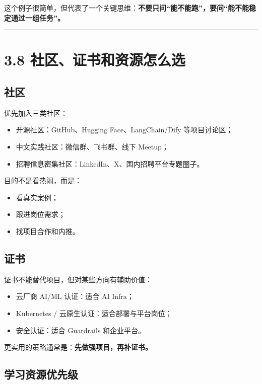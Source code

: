这个例子很简单，但代表了一个关键思维：\textbf{不要只问“能不能跑”，要问“能不能稳定通过一组任务”。}


\bigskip\hrule\bigskip

\section{3.8 社区、证书和资源怎么选}

\subsection{社区}

优先加入三类社区：


\begin{itemize}[leftmargin=2em]
\item 开源社区：GitHub、Hugging Face、LangChain/Dify 等项目讨论区；
\item 中文实践社区：微信群、飞书群、线下 Meetup；
\item 招聘信息密集社区：LinkedIn、X、国内招聘平台专题圈子。
\end{itemize}

目的不是看热闹，而是：


\begin{itemize}[leftmargin=2em]
\item 看真实案例；
\item 跟进岗位需求；
\item 找项目合作和内推。
\end{itemize}

\subsection{证书}

证书不能替代项目，但对某些方向有辅助价值：


\begin{itemize}[leftmargin=2em]
\item 云厂商 AI/ML 认证：适合 AI Infra；
\item Kubernetes / 云原生认证：适合部署与平台岗位；
\item 安全认证：适合 Guardrails 和企业平台。
\end{itemize}

更实用的策略通常是：\textbf{先做强项目，再补证书。}


\subsection{学习资源优先级}

